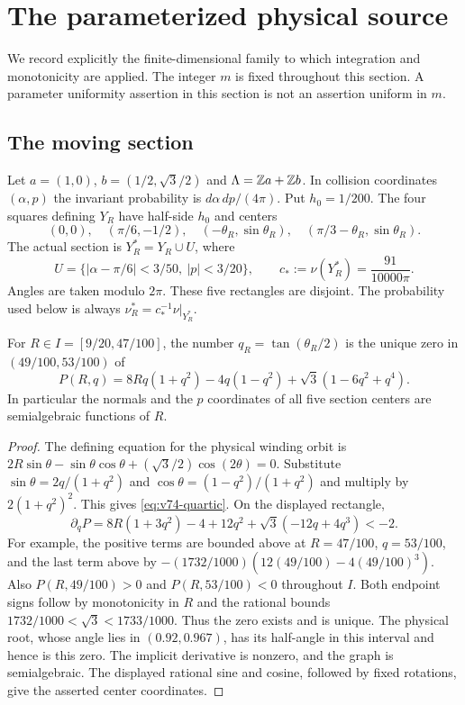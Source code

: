 \section{The parameterized physical source}
\label{sec:v74-physical-graph}
We record explicitly the finite-dimensional family to which integration
and monotonicity are applied. The integer $m$ is fixed throughout this
section. A parameter uniformity assertion in this section is not an
assertion uniform in $m$.

\subsection{The moving section}
Let $a=(1,0)$, $b=(1/2,\sqrt3/2)$ and $\Lambda=\mathbb Z a+\mathbb Z b$.
In collision coordinates $(\alpha,p)$ the invariant probability is
$d\alpha\,dp/(4\pi)$. Put $h_0=1/200$. The four squares defining
$Y_R$ have half-side $h_0$ and centers
\[
 (0,0),\quad(\pi/6,-1/2),\quad
 (-\theta_R,\sin\theta_R),\quad
 (\pi/3-\theta_R,\sin\theta_R).
\]
The actual section is $Y_R^*=Y_R\cup U$, where
\[
 U=\{|\alpha-\pi/6|<3/50,\ |p|<3/20\},\qquad
 c_*:=\nu(Y_R^*)=\frac{91}{10000\pi}.
\]
Angles are taken modulo $2\pi$. These five rectangles are disjoint.
The probability used below is always $\nu_R^*=c_*^{-1}\nu|_{Y_R^*}$.

\begin{lemma}
\label{lem:v74-half-angle}
For $R\in I=[9/20,47/100]$, the number $q_R=\tan(\theta_R/2)$
is the unique zero in $(49/100,53/100)$ of
\begin{equation}\label{eq:v74-quartic}
 P(R,q)=8Rq(1+q^2)-4q(1-q^2)
                       +\sqrt3(1-6q^2+q^4).
\end{equation}
In particular the normals and the $p$ coordinates of all five section
centers are semialgebraic functions of $R$.
\end{lemma}
\begin{proof}
The defining equation for the physical winding orbit is
$2R\sin\theta-\sin\theta\cos\theta
 +(\sqrt3/2)\cos(2\theta)=0$.
Substitute $\sin\theta=2q/(1+q^2)$ and
$\cos\theta=(1-q^2)/(1+q^2)$ and multiply by $2(1+q^2)^2$.
This gives \eqref{eq:v74-quartic}. On the displayed rectangle,
\[
 \partial_qP=8R(1+3q^2)-4+12q^2+\sqrt3(-12q+4q^3)<-2.
\]
For example, the positive terms are bounded above at $R=47/100$,
$q=53/100$, and the last term above by
$-(1732/1000)(12(49/100)-4(49/100)^3)$.
Also $P(R,49/100)>0$ and $P(R,53/100)<0$ throughout $I$.
Both endpoint signs follow by monotonicity in $R$ and the rational
bounds $1732/1000<\sqrt3<1733/1000$. Thus the zero exists and is
unique. The physical root, whose angle lies in $(0.92,0.967)$,
has its half-angle in this interval and hence is this zero.
The implicit derivative is nonzero, and the graph is semialgebraic.
The displayed rational sine and cosine, followed by fixed rotations,
give the asserted center coordinates.
\end{proof}

